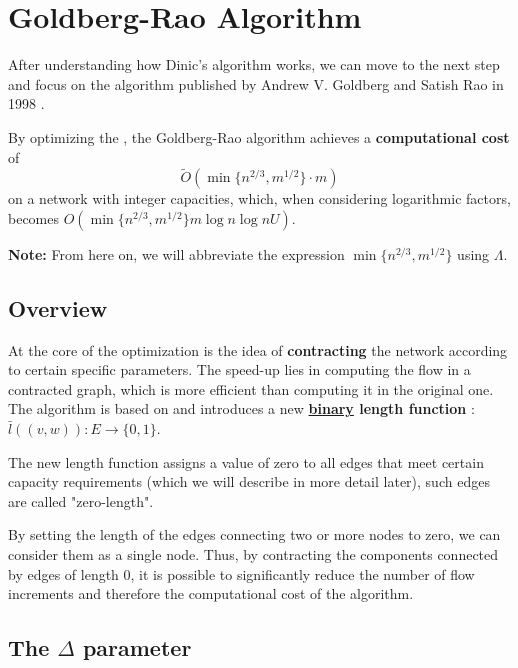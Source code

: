 \chapter{Goldberg-Rao Algorithm}

\label{chap:gbr}
After understanding how Dinic's algorithm works, we can move to the next step and focus on the algorithm published by Andrew V. Goldberg and Satish Rao in 1998 \cite{Goldberg_Rao}.

\noindent By optimizing the , the Goldberg-Rao algorithm achieves a \textbf{computational cost} of 
\[
\tilde{O}(\min\{n^{2/3}, m^{1/2}\} \cdot m)
\]
on a network with integer capacities, which, when considering logarithmic factors, becomes \( O(\min\{n^{2/3}, m^{1/2}\} m \log n \log nU) \).

\textbf{Note:} From here on, we will abbreviate the expression \( \min\{n^{2/3}, m^{1/2}\} \) using \( \Lambda \).

\section{Overview}

    At the core of the optimization is the idea of \textbf{contracting} the network according to certain specific parameters.  
    The speed-up lies in computing the flow in a contracted graph, which is more efficient than computing it in the original one.
    The algorithm is based on  and introduces a new  \textbf{\underline{binary} length function} : \( \bar{l}((v,w)): E \rightarrow \{0,1\} \).  

    The new length function assigns a value of zero to all edges that meet certain capacity requirements (which we will describe in more detail later), such edges are called "zero-length".

    By setting the length of the edges connecting two or more nodes to zero, we can consider them as a single node.  
    Thus, by contracting the components connected by edges of length 0, it is possible to significantly reduce the number of flow increments and therefore the computational cost of the algorithm.

\section{The $\Delta$ parameter}

